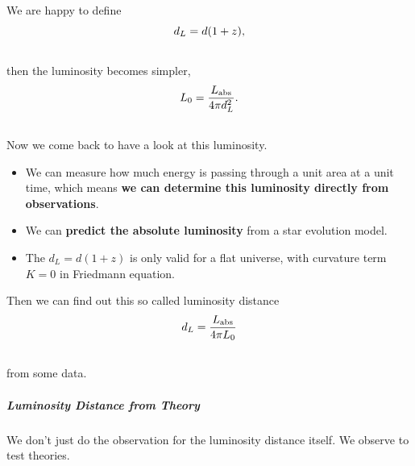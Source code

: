 \documentclass[letterpaper,10pt,english]{sphinxmanual}
\begin{document}
{We are happy to define
\begin{gather}
\begin{split}d_L = d (1+z) ,\end{split}\notag\\\begin{split}\end{split}\notag
\end{gather}
then the luminosity becomes simpler,
\begin{gather}
\begin{split}L_0 = \frac{L_{\mathrm {abs}}}{4\pi d_L^2} .\end{split}\notag\\\begin{split}\end{split}\notag
\end{gather}
Now we come back to have a look at this luminosity.
\begin{itemize}
\item {} 
We can measure how much energy is passing through a unit area at a unit time, which means \textbf{we can determine this luminosity directly from observations}.

\item {} 
We can \textbf{predict the absolute luminosity} from a star evolution model.

\item {} 
The $d_L = d (1+z)$ is only valid for a flat universe, with curvature term $K=0$ in Friedmann equation.

\end{itemize}

Then we can find out this so called luminosity distance
\begin{gather}
\begin{split}d_L = \frac{  L_{\mathrm {abs}} }{ 4\pi L_0 }\end{split}\notag\\\begin{split}\end{split}\notag
\end{gather}
from some data.


\subparagraph{Luminosity Distance from Theory}
\label{Cosmology/cosmoIndex:luminosity-distance-from-theory}
We don't just do the observation for the luminosity distance itself.
We observe to test theories.

}
\end{document}
